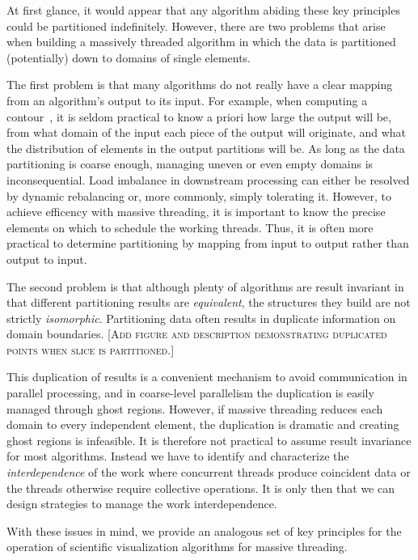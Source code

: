 \documentclass{sig-alternate}
\newcommand*{\lcite}[1]{~\cite{#1}}
\newcommand*{\keyterm}[1]{\emph{#1}}
\newcommand{\fix}[1]{{\color{red}\textsc{[#1]}}}
\begin{document}
At first glance, it would appear that any algorithm abiding these key
principles could be partitioned indefinitely. However, there are two
problems that arise when building a massively threaded algorithm in which
the data is partitioned (potentially) down to domains of single elements.

The first problem is that many algorithms do not really have a clear
mapping from an algorithm's output to its input. For example, when
computing a contour\lcite{Lorensen1987}, it is seldom practical to know a
priori how large the output will be, from what domain of the input each
piece of the output will originate, and what the distribution of elements
in the output partitions will be. As long as the data partitioning is
coarse enough, managing uneven or even empty domains is
inconsequential. Load imbalance in downstream processing can either be
resolved by dynamic rebalancing or, more commonly, simply tolerating
it. However, to achieve efficency with massive threading, it is important
to know the precise elements on which to schedule the working
threads. Thus, it is often more practical to determine partitioning by
mapping from input to output rather than output to input.

The second problem is that although plenty of algorithms are result
invariant in that different partitioning results are \emph{equivalent}, the
structures they build are not strictly \emph{isomorphic}. Partitioning data
often results in duplicate information on domain boundaries. \fix{Add
  figure and description demonstrating duplicated points when slice is
  partitioned.}

This duplication of results is a convenient mechanism to avoid
communication in parallel processing, and in coarse-level parallelism the
duplication is easily managed through ghost regions. However, if massive
threading reduces each domain to every independent element, the duplication
is dramatic and creating ghost regions is infeasible. It is therefore not
practical to assume result invariance for most algorithms. Instead we have
to identify and characterize the \keyterm{interdependence} of the work
where concurrent threads produce coincident data or the threads otherwise
require collective operations. It is only then that we can design
strategies to manage the work interdependence.

With these issues in mind, we provide an analogous set of key principles
for the operation of scientific visualization algorithms for massive
threading.
\end{document}
